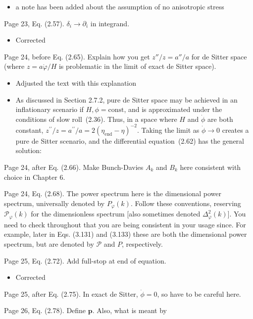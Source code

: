 \documentclass[11pt]{article}
\newcommand{\todo}[1]{{\color{red} #1}}
\begin{document}
\begin{enumerate}
\begin{itemize}
    \item a note has been added about the assumption of no anisotropic stress
  \end{itemize}
\item Page 23, Eq. (2.57). $\delta_i \rightarrow \partial_i$ in
  integrand.
  \begin{itemize}
    \item Corrected
  \end{itemize}
\item Page 24, before Eq. (2.65). Explain how you get $z''/z = a''/a$
  for de Sitter space (where $z = a\dot{\varphi}/H$ is problematic in
  the limit of exact de Sitter space).
  \begin{itemize}
    \item Adjusted the text with this explanation
    \item As discussed in Section 2.7.2, pure de Sitter space may be achieved in an inflationary scenario if \(H,\phi=\mathrm{const}\), and is approximated under the conditions of slow roll~(2.36).  Thus, in a space where \(H\) and \(\dot\phi\) are both constant, \({z^{\prime\prime}/z = a^{\prime\prime}/a = 2{(\eta_\mathrm{end}-\eta)}^{-2}}\). Taking the limit as \(\dot{\phi}\to0\) creates a pure de Sitter scenario, and the differential equation~(2.62) has the general solution:
  \end{itemize}
  \todo{
\item Page 24, after Eq. (2.66). Make Bunch-Davies $A_k$ and $B_k$
  here consistent with choice in Chapter 6.
}
\todo{
\item Page 24, Eq. (2.68). The power spectrum here is the dimensional
  power spectrum, universally denoted by $P_{\varphi}(k)$. Follow
  these conventions, reserving $\mathcal{P}_\varphi(k)$ for the
  dimensionless spectrum [also sometimes denoted
  $\Delta_\varphi^2(k)$]. You need to check throughout that you are
  being consistent in your usage since. For example, later in
  Eqs. (3.131) and (3.133) these are both the dimensional power
  spectrum, but are denoted by $\mathcal{P}$ and $P$, respectively.
}
\item Page 25, Eq. (2.72). Add full-stop at end of equation.
  \begin{itemize}
    \item Corrected
  \end{itemize}
  \todo{
\item Page 25, after Eq. (2.75). In exact de Sitter, $\dot{\phi} = 0$,
  so have to be careful here.
}
\todo{
\item Page 26, Eq. (2.78). Define $\mathbf{p}$. Also, what is meant by
}
\end{enumerate}
\end{document}
